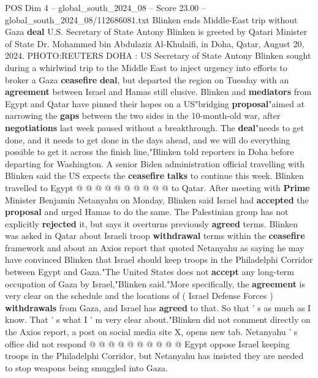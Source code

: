 \begin{textsample}{POS Dim 4 – global\_south\_2024\_08 – Score 23.00 – global\_south\_2024\_08/112686081.txt}  \label{ex:f4_pos_126}
Blinken ends Middle-East trip without Gaza \textbf{deal} U.S.
Secretary of State Antony Blinken is greeted by Qatari Minister of State Dr.
Mohammed bin Abdulaziz Al-Khulaifi, in Doha, Qatar, August 20, 2024.
PHOTO:REUTERS DOHA : US Secretary of State Antony Blinken sought during a whirlwind trip to the Middle East to inject urgency into efforts to broker a Gaza \textbf{ceasefire} \textbf{deal}, but departed the region on Tuesday with an \textbf{agreement} between Israel and Hamas still elusive.
Blinken and \textbf{mediators} from Egypt and Qatar have pinned their hopes on a US"bridging \textbf{proposal}"aimed at narrowing the \textbf{gaps} between the two sides in the 10-month-old war, after \textbf{negotiations} last week paused without a breakthrough.
The \textbf{deal}"needs to get done, and it needs to get done in the days ahead, and we will do everything possible to get it across the finish line,"Blinken told reporters in Doha before departing for Washington.
A senior Biden administration official travelling with Blinken said the US expects the \textbf{ceasefire} \textbf{talks} to continue this week.
Blinken travelled to Egypt @ @ @ @ @ @ @ @ @ @ to Qatar.
After meeting with \textbf{Prime} Minister Benjamin Netanyahu on Monday, Blinken said Israel had \textbf{accepted} the \textbf{proposal} and urged Hamas to do the same.
The Palestinian group has not explicitly \textbf{rejected} it, but says it overturns previously \textbf{agreed} terms.
Blinken was asked in Qatar about Israeli troop \textbf{withdrawal} terms within the \textbf{ceasefire} framework and about an Axios report that quoted Netanyahu as saying he may have convinced Blinken that Israel should keep troops in the Philadelphi Corridor between Egypt and Gaza."The United States does not \textbf{accept} any long-term occupation of Gaza by Israel,"Blinken said."More specifically, the \textbf{agreement} is very clear on the schedule and the locations of ( Israel Defense Forces ) \textbf{withdrawals} from Gaza, and Israel has \textbf{agreed} to that.
So that ' s as much as I know.
That ' s what I ' m very clear about."Blinken did not comment directly on the Axios report, a post on social media site X, opens new tab.
Netanyahu ' s office did not respond @ @ @ @ @ @ @ @ @ @ Egypt oppose Israel keeping troops in the Philadelphi Corridor, but Netanyahu has insisted they are needed to stop weapons being smuggled into Gaza.

\end{textsample}
